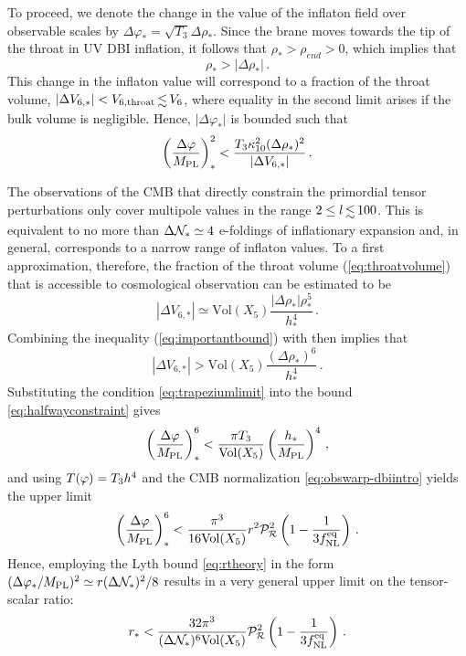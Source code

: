 To proceed, we denote the change in the value of the inflaton field over 
observable scales by 
$\Delta  \varphi _{*} = \sqrt{T_3} \Delta \rho_{*}$. 
Since the brane moves towards the tip of the throat in 
UV DBI inflation, it follows that $\rho_{*} > \rho_{end} >0$, which 
implies that  
% 
\begin{equation}
\label{eq:importantbound}
\rho_{*} > |\Delta \rho _{*}| \,.
\end{equation}
% 
This change in the inflaton value will correspond 
to a fraction of the throat volume, 
$| \Delta V _{6,*}|  < {V_{6,\mathrm{throat}}} \, \lsim \, {V_6} $,
where equality in the second limit arises if
the bulk volume is negligible. Hence, 
$| \Delta \varphi_* |$ is bounded such that  
% 
\begin{equation}
\label{eq:halfwayconstraint}
\left( \frac{\Delta \varphi}{M_{\mathrm{PL}}} \right)^2_{*} < 
\frac{T_3 \kappa_{10}^2 (\Delta \rho_{*})^2}{|\Delta V_{6,*}|} \,.
\end{equation}
%  


The observations of the CMB 
that directly constrain the primordial tensor perturbations only 
cover multipole values in the range $2 \le l \, \lsim \, 100$. 
This is equivalent to no more than ${\Delta \mathcal{N}_{*}} \simeq {4}$ 
e-foldings of inflationary expansion and, in general,   
corresponds to a narrow range of inflaton values. 
To a first approximation, therefore, the fraction of the throat volume 
(\ref{eq:throatvolume}) that is accessible to cosmological 
observation can be estimated to be 
% 
\begin{equation}
\label{eq:trapezium}
| \Delta V_{6,*} | \simeq \mathrm{Vol}(X_5) 
\frac{|\Delta \rho_*| \rho^5_{*}}{h^{4}_{*}} \,.
\end{equation}
% 
Combining the inequality (\ref{eq:importantbound}) with  
then implies that 
% 
\begin{equation}
\label{eq:trapeziumlimit}
|\Delta V _{6,*}| > \mathrm{Vol}(X_5) 
\frac{(\Delta \rho_* )^6}{h^{4}_*}  \,.
\end{equation}
% 
Substituting the condition \eqref{eq:trapeziumlimit} into the bound
\eqref{eq:halfwayconstraint} gives
\begin{equation}
\label{eq:hbound6}
\left( \frac{\Delta \varphi}{M_{\mathrm{PL}}} \right)_*^6 < \frac{\pi T_3}{\mathrm{Vol} (X_5)} 
\left( \frac{h_*}{M_{\mathrm{PL}}} \right)^4 \,,
\end{equation}   
and using $T(\varphi) = T_3 h^4$ and the CMB normalization
\eqref{eq:obswarp-dbiintro} yields the upper limit
% 
\begin{equation}
\label{eq:boundpower6}
\left( \frac{\Delta \varphi}{M_{\mathrm{PL}}} \right)^6_{*} 
< \frac{\pi^3}{16\mathrm{Vol}(X_5)} r^2 \mathcal{P}_{\mathcal{R}}^2  
\left( 1- \frac{1}{3f_{\mathrm{NL}}^{\mathrm{eq}}} \right)  \,.
\end{equation}
% 
Hence, employing the Lyth bound \eqref{eq:rtheory} in the form
$(\Delta \varphi_* / M_{\mathrm{PL}} )^2 \simeq 
r (\Delta \mathcal{N}_*)^2 /8$  
results in a very general upper limit on the tensor-scalar ratio: 
% 
\begin{equation}
\label{eq:generalbound}
r_{*} < \frac{32 \pi^3}{(\Delta \mathcal{N}_*)^6 \mathrm{Vol}(X_5)} 
\mathcal{P}_{\mathcal{R}}^2  \left( 1- \frac{1}{3f_{\mathrm{NL}}^{\mathrm{eq}}} \right) \,.
\end{equation}
% 


